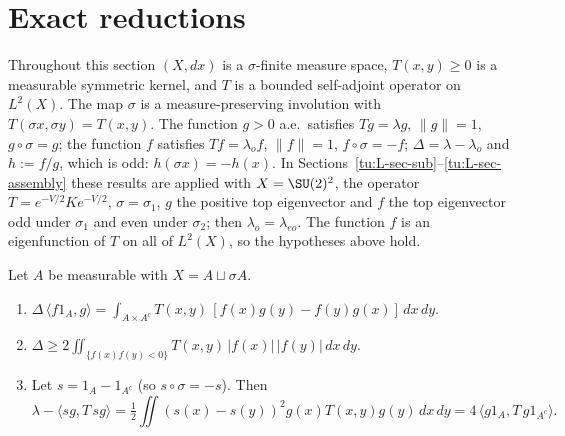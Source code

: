 
\section{Exact reductions}\label{tu:L-sec-exact}

Throughout this section $(X,dx)$ is a $\sigma$-finite measure space, $T(x,y)\ge 0$ is a measurable
symmetric kernel, and $T$ is a bounded self-adjoint operator on $L^2(X)$. The map $\sigma$ is a
measure-preserving involution with $T(\sigma x,\sigma y)=T(x,y)$. The function $g>0$ a.e.\ satisfies
$Tg=\lambda g$, $\|g\|=1$, $g\circ\sigma=g$; the function $f$ satisfies $Tf=\lambda_{o}f$, $\|f\|=1$,
$f\circ\sigma=-f$; $\Delta=\lambda-\lambda_o$ and $h:=f/g$, which is odd: $h(\sigma x)=-h(x)$.
In Sections~\ref{tu:L-sec-sub}--\ref{tu:L-sec-assembly} these results are applied with $X=\SU(2)^2$,
the operator $T=e^{-V/2}Ke^{-V/2}$, $\sigma=\sigma_1$, $g$ the positive top eigenvector and $f$ the
top eigenvector odd under $\sigma_1$ and even under $\sigma_2$; then $\lambda_o=\lambda_{eo}$.
The function $f$ is an eigenfunction of $T$ on all of $L^2(X)$, so the hypotheses above hold.

\begin{lemma}\label{tu:L-flux}
Let $A$ be measurable with $X=A\sqcup\sigma A$.
\begin{enumerate}
\item[(I0)] $\Delta\,\langle f1_A,g\rangle=\int_{A\times A^c}T(x,y)\,[f(x)g(y)-f(y)g(x)]\,dx\,dy$.
\item[(I1)] $\Delta\ge 2\iint_{\{f(x)f(y)<0\}}T(x,y)\,|f(x)|\,|f(y)|\,dx\,dy$.
\item[(I2)] Let $s=1_A-1_{A^c}$ (so $s\circ\sigma=-s$). Then
\[
\lambda-\langle sg,T\,sg\rangle=\tfrac12\iint (s(x)-s(y))^2 g(x)T(x,y)g(y)\,dx\,dy
=4\,\langle g1_A,T\,g1_{A^c}\rangle .
\]
\end{enumerate}
\end{lemma}

